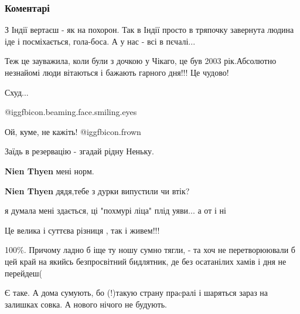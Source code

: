  
 
 
 
 
\subsubsection{Коментарі}

\begin{itemize} %
З Індії вертаєш - як на похорон. Так в Індії просто в тряпочку завернута людина іде і посміхається, гола-боса. А у нас - всі в пєчалі...

Теж це зауважила, коли були з дочкою у Чікаго, це був 2003 рік.Абсолютно незнайомі люди вітаються і бажають гарного дня!!! Це чудово!

Схуд...


 @igg{fbicon.beaming.face.smiling.eyes} 

Ой, куме, не кажіть!  @igg{fbicon.frown} 


Заїдь в резервацію - згадай рідну Неньку.

\begin{itemize} %

\textbf{Nien Thyen} мені норм.

\textbf{Nien Thyen} дядя,тебе з дурки випустили чи втік?
\end{itemize} %

я думала мені здається, ці "похмурі ліца" плід уяви... а от і ні

Це велика і суттєва різниця , так і живем!!!


100\%. Причому ладно б іще ту ношу сумно тягли, - та хоч не перетворюювали б цей
край на якийсь безпросвітний бидлятник, де без осатанілих хамів і дня не
перейдеш(


Є таке.
А дома сумують, бо (!)такую страну праcралі і шаряться зараз на залишках совка. А нового нічого не будують.


\end{itemize}
